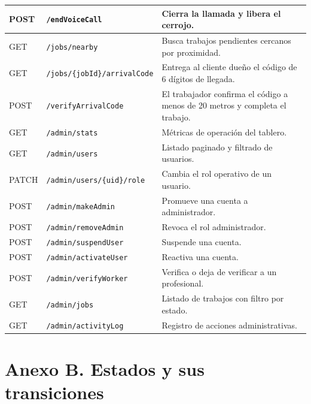 \documentclass[doc,12pt,a4paper]{apa7}
\begin{document}
\begin{longtable}{|P{3.0cm}|P{6.0cm}|L{5.0cm}|}
POST & \texttt{/endVoiceCall} & Cierra la llamada y libera el cerrojo. \\ \hline
GET & \texttt{/jobs/nearby} & Busca trabajos pendientes cercanos por proximidad. \\ \hline
GET & \texttt{/jobs/\{jobId\}/arrivalCode} & Entrega al cliente dueño el código de 6 dígitos de llegada. \\ \hline
POST & \texttt{/verifyArrivalCode} & El trabajador confirma el código a menos de 20 metros y completa el trabajo. \\ \hline
GET & \texttt{/admin/stats} & Métricas de operación del tablero. \\ \hline
GET & \texttt{/admin/users} & Listado paginado y filtrado de usuarios. \\ \hline
PATCH & \texttt{/admin/users/\{uid\}/role} & Cambia el rol operativo de un usuario. \\ \hline
POST & \texttt{/admin/makeAdmin} & Promueve una cuenta a administrador. \\ \hline
POST & \texttt{/admin/removeAdmin} & Revoca el rol administrador. \\ \hline
POST & \texttt{/admin/suspendUser} & Suspende una cuenta. \\ \hline
POST & \texttt{/admin/activateUser} & Reactiva una cuenta. \\ \hline
POST & \texttt{/admin/verifyWorker} & Verifica o deja de verificar a un profesional. \\ \hline
GET & \texttt{/admin/jobs} & Listado de trabajos con filtro por estado. \\ \hline
GET & \texttt{/admin/activityLog} & Registro de acciones administrativas. \\ \hline
\end{longtable}

\section*{Anexo B. Estados y sus transiciones}
\end{document}
